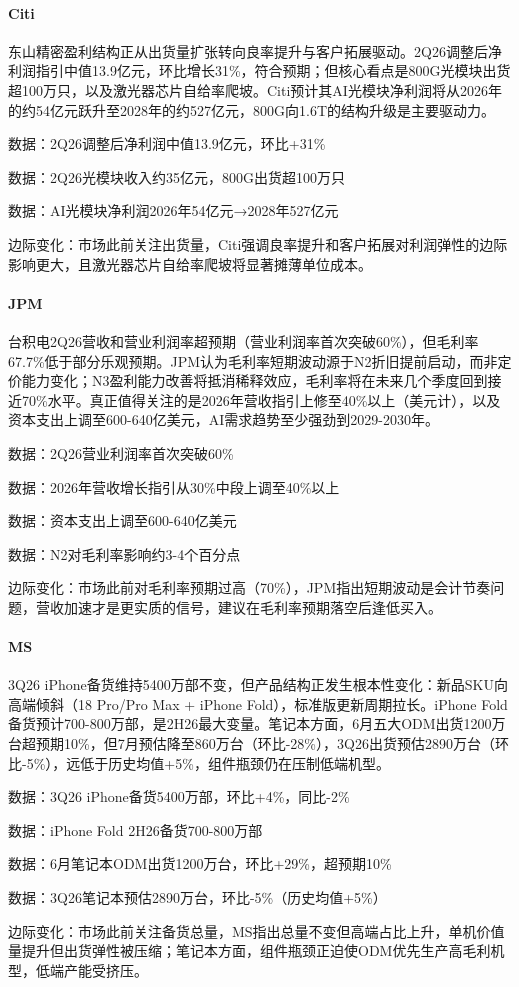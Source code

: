 \documentclass[11pt]{ctexart}
\begin{document}
\paragraph{Citi} 东山精密盈利结构正从出货量扩张转向良率提升与客户拓展驱动。2Q26调整后净利润指引中值13.9亿元，环比增长31\%，符合预期；但核心看点是800G光模块出货超100万只，以及激光器芯片自给率爬坡。Citi预计其AI光模块净利润将从2026年的约54亿元跃升至2028年的约527亿元，800G向1.6T的结构升级是主要驱动力。
{\small\color{refgray}数据：2Q26调整后净利润中值13.9亿元，环比+31\%\par}
{\small\color{refgray}数据：2Q26光模块收入约35亿元，800G出货超100万只\par}
{\small\color{refgray}数据：AI光模块净利润2026年54亿元→2028年527亿元\par}
{\small\color{refgray}边际变化：市场此前关注出货量，Citi强调良率提升和客户拓展对利润弹性的边际影响更大，且激光器芯片自给率爬坡将显著摊薄单位成本。\par}
\paragraph{JPM} 台积电2Q26营收和营业利润率超预期（营业利润率首次突破60\%），但毛利率67.7\%低于部分乐观预期。JPM认为毛利率短期波动源于N2折旧提前启动，而非定价能力变化；N3盈利能力改善将抵消稀释效应，毛利率将在未来几个季度回到接近70\%水平。真正值得关注的是2026年营收指引上修至40\%以上（美元计），以及资本支出上调至600-640亿美元，AI需求趋势至少强劲到2029-2030年。
{\small\color{refgray}数据：2Q26营业利润率首次突破60\%\par}
{\small\color{refgray}数据：2026年营收增长指引从30\%中段上调至40\%以上\par}
{\small\color{refgray}数据：资本支出上调至600-640亿美元\par}
{\small\color{refgray}数据：N2对毛利率影响约3-4个百分点\par}
{\small\color{refgray}边际变化：市场此前对毛利率预期过高（70\%），JPM指出短期波动是会计节奏问题，营收加速才是更实质的信号，建议在毛利率预期落空后逢低买入。\par}
\paragraph{MS} 3Q26 iPhone备货维持5400万部不变，但产品结构正发生根本性变化：新品SKU向高端倾斜（18 Pro/Pro Max + iPhone Fold），标准版更新周期拉长。iPhone Fold备货预计700-800万部，是2H26最大变量。笔记本方面，6月五大ODM出货1200万台超预期10\%，但7月预估降至860万台（环比-28\%），3Q26出货预估2890万台（环比-5\%），远低于历史均值+5\%，组件瓶颈仍在压制低端机型。
{\small\color{refgray}数据：3Q26 iPhone备货5400万部，环比+4\%，同比-2\%\par}
{\small\color{refgray}数据：iPhone Fold 2H26备货700-800万部\par}
{\small\color{refgray}数据：6月笔记本ODM出货1200万台，环比+29\%，超预期10\%\par}
{\small\color{refgray}数据：3Q26笔记本预估2890万台，环比-5\%（历史均值+5\%）\par}
{\small\color{refgray}边际变化：市场此前关注备货总量，MS指出总量不变但高端占比上升，单机价值量提升但出货弹性被压缩；笔记本方面，组件瓶颈正迫使ODM优先生产高毛利机型，低端产能受挤压。\par}
\end{document}
